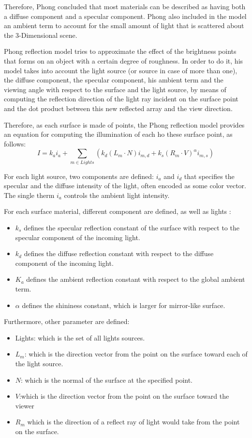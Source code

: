 \documentclass[12pt,a4paper]{extarticle}
\newcommand{\linespace}{\vspace{8pt}}
\begin{document}
Therefore, Phong concluded that most materials can be described as having both a diffuse component and a specular component. Phong also included in the model an ambient term to account for the small amount of light that is scattered about the 3-Dimensional scene.
\linespace

Phong reflection model tries to approximate the effect of the brightness points that forms on an object with a certain degree of roughness. In order to do it, his model takes into account the light source (or source in case of more than one), the diffuse component, the specular component, his ambient term and the viewing angle with respect to the surface and the light source, by means of computing the reflection direction of the light ray incident on the surface point and the dot product between this new reflected array and the view direction.

Therefore, as each surface is made of points, the Phong reflection model provides an equation for computing the illumination of each ho these surface point, as follows:
\[
I = k_{a} i_{a} + \sum_{m \in Lights} (k_{d}(L_{m} \cdot N)i_{m,d} +k_{s}(R_{m} \cdot V)^{\alpha}i_{m,s})
\]

For each light source, two components are defined: $i_{a}$ and $i_{d}$ that specifies the specular and the diffuse intensity of the light, often encoded as some color vector. The single therm $i_{a}$ controls the ambient light intensity.

For each surface material, different component  are defined, as well as lights :
\begin{itemize}
\item $k_{s}$ defines the specular reflection constant of the surface with respect to the specular component of the incoming light.

\item $k_{d}$ defines the diffuse reflection constant with respect to the diffuse component of the incoming light.

\item $K_{a}$ defines the ambient reflection constant with respect to the global ambient term.
\item$\alpha$ defines the shininess constant, which is larger for mirror-like surface.
\end{itemize}

Furthermore, other parameter are defined:
\begin{itemize}
\item Lights: which is the set of all lights sources.
\item $L_{m}$: which is the direction vector from the point on the surface toward each of the light source.
\item $N$: which is the normal of the surface at the specified point.
\item $V$:which is the direction vector from the point on the surface toward the viewer
\item $R_{m}$ which is the direction of a reflect ray of light would take from the point on the surface.
\end{itemize}
\end{document}
